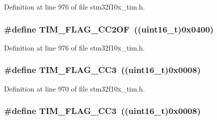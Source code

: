 Definition at line 976 of file stm32f10x\+\_\+tim.\+h.

\subsubsection[{\texorpdfstring{T\+I\+M\+\_\+\+F\+L\+A\+G\+\_\+\+C\+C2\+OF}{TIM_FLAG_CC2OF}}]{\setlength{\rightskip}{0pt plus 5cm}\#define T\+I\+M\+\_\+\+F\+L\+A\+G\+\_\+\+C\+C2\+OF~(({\bf uint16\+\_\+t})0x0400)}\hypertarget{group___t_i_m___flags_ga4df0c71d3e695c214d49802942e04590}{}\label{group___t_i_m___flags_ga4df0c71d3e695c214d49802942e04590}


Definition at line 976 of file stm32f10x\+\_\+tim.\+h.

\subsubsection[{\texorpdfstring{T\+I\+M\+\_\+\+F\+L\+A\+G\+\_\+\+C\+C3}{TIM_FLAG_CC3}}]{\setlength{\rightskip}{0pt plus 5cm}\#define T\+I\+M\+\_\+\+F\+L\+A\+G\+\_\+\+C\+C3~(({\bf uint16\+\_\+t})0x0008)}\hypertarget{group___t_i_m___flags_ga052c380f922219659810e4fceb574a7c}{}\label{group___t_i_m___flags_ga052c380f922219659810e4fceb574a7c}


Definition at line 970 of file stm32f10x\+\_\+tim.\+h.

\subsubsection[{\texorpdfstring{T\+I\+M\+\_\+\+F\+L\+A\+G\+\_\+\+C\+C3}{TIM_FLAG_CC3}}]{\setlength{\rightskip}{0pt plus 5cm}\#define T\+I\+M\+\_\+\+F\+L\+A\+G\+\_\+\+C\+C3~(({\bf uint16\+\_\+t})0x0008)}\hypertarget{group___t_i_m___flags_ga052c380f922219659810e4fceb574a7c}{}\label{group___t_i_m___flags_ga052c380f922219659810e4fceb574a7c}


